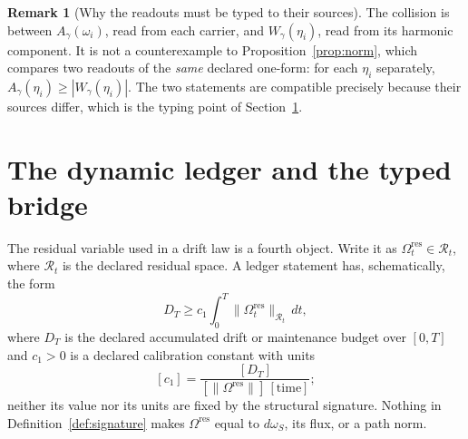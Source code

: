 \documentclass[11pt]{article}
\theoremstyle{definition}
\newtheorem{remark}[theorem]{Remark}
\newcommand{\Omres}{\Omega^{\mathrm{res}}}
\begin{document}
\begin{remark}[Why the readouts must be typed to their sources]
The collision is between \(A_\gamma(\omega_i)\), read from each carrier,
and \(W_\gamma(\eta_i)\), read from its harmonic component.  It is not a
counterexample to Proposition~\ref{prop:norm}, which compares two readouts
of the \emph{same} declared one-form: for each \(\eta_i\) separately,
\(A_\gamma(\eta_i)\ge|W_\gamma(\eta_i)|\).  The two statements are
compatible precisely because their sources differ, which is the typing
point of Section~\ref{sec:bridge}.
\end{remark}

\section{The dynamic ledger and the typed bridge}\label{sec:bridge}

The residual variable used in a drift law is a fourth object.  Write it
as \(\Omres_t\in\mathcal R_t\), where \(\mathcal R_t\) is the declared
residual space.  A ledger statement has, schematically, the form
\[
D_T\ge c_1\int_0^T\|\Omres_t\|_{\mathcal R_t}\,dt,
\]
where \(D_T\) is the declared accumulated drift or maintenance budget over
\([0,T]\) and \(c_1>0\) is a declared calibration constant with units
\[
[c_1]=\frac{[D_T]}{[\lVert\Omres\rVert]\, [\mathrm{time}]};
\]
neither its value nor its units are fixed by the structural signature.
Nothing in Definition~\ref{def:signature} makes
\(\Omres\) equal to \(d\omega_S\), its flux, or a path norm.
\end{document}
